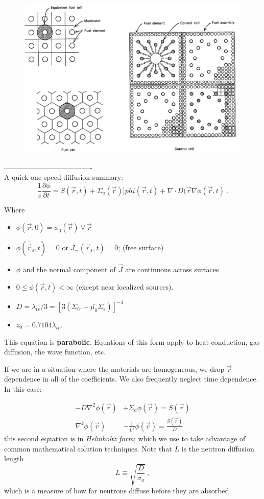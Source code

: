 \documentclass[12pt]{article}
\newcommand{\rvec}{\ensuremath{\vec{r}}}
\begin{document}
\begin{figure}
    \begin{center}
    \includegraphics[keepaspectratio, width = 5 in]{unit-cell}
    \end{center}
    \label{fig:phase_space}
\end{figure}

-------------------------------------\\
A quick one-speed diffusion summary:
\[\frac{1}{v} \frac{\partial \phi}{\partial t} = S(\rvec, t) + \Sigma_a(\rvec) ]phi(\rvec, t) + \nabla \cdot D(\rvec \nabla \phi(\rvec, t)\:.\]

Where
\begin{itemize}
\item $\phi(\rvec, 0) = \phi_0(\rvec) \: \forall \: \rvec$
\item $\phi(\tilde{\rvec_s}, t) = 0$ or $J_-(\rvec_s, t) = 0$; (free surface)
\item $\phi$ and the normal component of $\vec{J}$ are continuous across surfaces
\item $0 \leq \phi(\rvec, t) < \infty$ (except near localized sources).
\item $D = \lambda_{tr}/3 = [3(\Sigma_{tr} - \bar{\mu_0}\Sigma_s)]^{-1}$
\item $z_0 = 0.7104 \lambda_{tr}$.
\end{itemize}
This equation is \textbf{parabolic}. Equations of this form apply to heat conduction, gas diffusion, the wave function, etc.

If we are in a situation where the materials are homogeneous, we drop $\rvec$ dependence in all of the coefficients. 
We also frequently neglect time dependence. 
In this case:

\begin{align*}
-D \nabla^2 \phi(\rvec) &+ \Sigma_a \phi(\rvec) = S(\rvec) \\
\nabla^2 \phi(\rvec) &- \frac{1}{L^2}\phi(\rvec) = \frac{S(\rvec)}{D}
\end{align*}
this second equation is in \textit{Helmholtz form}; which we use to take advantage of common mathematical solution techniques.
Note that $L$ is the neutron diffusion length
\[L \equiv \sqrt{\frac{D}{\sigma_a}}\:,\]
which is a measure of how far neutrons diffuse before they are absorbed.
\end{document}
